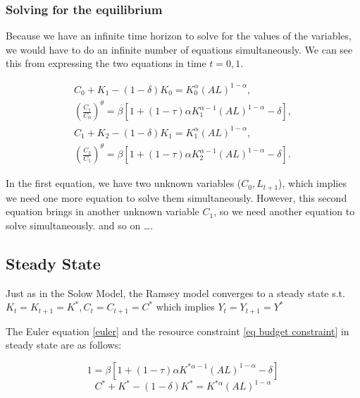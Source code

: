 \documentclass[11pt]{article}
\begin{document}
\subsubsection{Solving for the equilibrium}

Because we have an infinite time horizon to solve for the values of the variables, we would have to do an infinite number of equations simultaneously. We can see this from expressing the two equations in time $t=0,1$.

\begin{equation}
\begin{gathered}
C_0+K_1-(1-\delta) K_0=K_0^\alpha(A L)^{1-\alpha}, \\
\left(\frac{C_1}{C_0}\right)^\theta=\beta\left[1+(1-\tau) \alpha K_1^{\alpha-1}(A L)^{1-\alpha}-\delta\right], \\
C_1+K_2-(1-\delta) K_1=K_1^\alpha(A L)^{1-\alpha}, \\
\left(\frac{C_2}{C_1}\right)^\theta=\beta\left[1+(1-\tau) \alpha K_2^{\alpha-1}(A L)^{1-\alpha}-\delta\right] .
\end{gathered}
\end{equation}

In the first equation, we have two unknown variables ($C_0, L_{t+1}$), which implies we need one more equation to solve them simultaneously. However, this second equation brings in another unknown variable $C_1$, so we need another equation to solve simultaneously. and so on \ldots.

\subsection{Steady State}

Just as in the Solow Model, the Ramsey model converges to a steady state s.t. $K_t = K_{t+1} = K^*, C_t = C_{t+1} = C^*$ which implies $Y_t = Y_{t+1} = Y^*$

\begin{shaded}
    The Euler equation \eqref{euler} and the resource constraint \eqref{eq budget constraint} in steady state are as follows:

    \begin{equation}
        \label{ss euler}
        1 = \beta\left[1 + (1-\tau) \alpha K^{*\alpha-1} (AL)^{1-\alpha} - \delta \right]
    \end{equation}
    \begin{equation}
        \label{ss budget constraint}
        C^* + K^* - (1-\delta)K^* = K^{*\alpha} (AL)^{1-\alpha}
    \end{equation}
\end{shaded}
\end{document}
